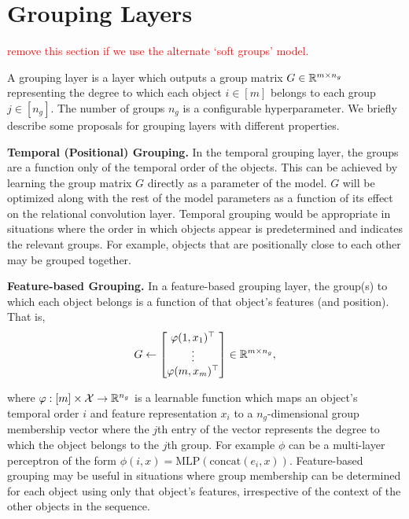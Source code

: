 \section{Grouping Layers}\label{sec:grouping_layers}

\textcolor{red}{remove this section if we use the alternate `soft groups' model.}

A grouping layer is a layer which outputs a group matrix $G \in \mathbb{R}^{m \times n_g}$ representing the degree to which each object $i \in [m]$ belongs to each group $j \in [n_g]$. The number of groups $n_g$ is a configurable hyperparameter. We briefly describe some proposals for grouping layers with different properties.

\textbf{Temporal (Positional) Grouping.} In the temporal grouping layer, the groups are a function only of the temporal order of the objects. This can be achieved by learning the group matrix $G$ directly as a parameter of the model. $G$ will be optimized along with the rest of the model parameters as a function of its effect on the relational convolution layer. Temporal grouping would be appropriate in situations where the order in which objects appear is predetermined and indicates the relevant groups. For example, objects that are positionally close to each other may be grouped together.

\textbf{Feature-based Grouping.} In a feature-based grouping layer, the group(s) to which each object belongs is a function of that object's features (and position). That is,
\begin{equation}\label{eq:feat_grouping}
        G \gets \begin{bmatrix}
            \varphi(1, x_1)^\top \\
            \vdots \\
            \varphi(m, x_m)^\top
        \end{bmatrix} \in \mathbb{R}^{m \times n_g},
\end{equation}

\noindent where $\varphi: [m] \times {\mathcal{X}} \to \mathbb{R}^{n_g}$ is a learnable function which maps an object's temporal order $i$ and feature representation $x_i$ to a $n_g$-dimensional group membership vector where the $j$th entry of the vector represents the degree to which the object belongs to the $j$th group. For example $\phi$ can be a multi-layer perceptron of the form $\phi(i, x) = \mathrm{MLP}(\mathrm{concat}(e_i, x))$. Feature-based grouping may be useful in situations where group membership can be determined for each object using only that object's features, irrespective of the context of the other objects in the sequence.

